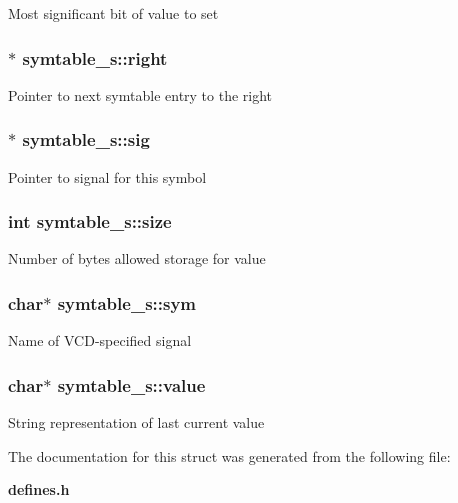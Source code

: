 Most significant bit of value to set 
\subsubsection{$\ast$ {\bf symtable\_\-s::right}}\label{structsymtable__s_o6}


Pointer to next symtable entry to the right 
\subsubsection{$\ast$ {\bf symtable\_\-s::sig}}\label{structsymtable__s_o1}


Pointer to signal for this symbol 
\subsubsection{\setlength{\rightskip}{0pt plus 5cm}int {\bf symtable\_\-s::size}}\label{structsymtable__s_o5}


Number of bytes allowed storage for value 
\subsubsection{\setlength{\rightskip}{0pt plus 5cm}char$\ast$ {\bf symtable\_\-s::sym}}\label{structsymtable__s_o0}


Name of VCD-specified signal 
\subsubsection{\setlength{\rightskip}{0pt plus 5cm}char$\ast$ {\bf symtable\_\-s::value}}\label{structsymtable__s_o4}


String representation of last current value 

The documentation for this struct was generated from the following file:\begin{CompactItemize}
\item 
{\bf defines.h}\end{CompactItemize}
